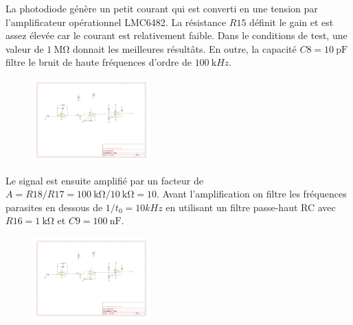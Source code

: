 \documentclass[french]{layout/Report}
\begin{document}
\begin{description}[leftmargin=!,labelwidth=3cm, labelindent=\parindent]
	\item[Convertisseur]
		La photodiode génère un petit courant qui est converti en une tension par l'amplificateur opérationnel LMC6482\cite{LMC6482}.
		La résistance $\mathit{R15}$ définit le gain et est assez élevée car le courant est relativement faible.
		Dans le conditions de test, une valeur de $\SI{1}{\mega\ohm}$ donnait les meilleures résultâts.
		En outre, la capacité $\mathit{C8} = \SI{10}{\pico\farad}$ filtre le bruit de haute fréquences d'ordre de $\SI{100}{\kilo Hz}$.

		\begin{figure}[H]
			\centering
			\includegraphics[width=0.4\textwidth]{fig/current_to_voltage_converter.pdf}
		\end{figure}

	\item[Amplificateur]
        Le signal est ensuite amplifié par un facteur de $A = \mathit{R18}/\mathit{R17} = \SI{100}{\kilo\ohm}/\SI{10}{\kilo\ohm} = 10$.
        Avant l'amplification on filtre les fréquences parasites en dessous de $1/t_0 = 10kHz$ en utilisant un filtre passe-haut RC avec $\mathit{R16} = \SI{1}{\kilo\ohm}$ et $\mathit{C9} = \SI{100}{\nano\farad}$.

		\begin{figure}[H]
			\centering
			\includegraphics[width=0.4\textwidth]{fig/amplifier.pdf}
		\end{figure}


\end{description}
\end{document}

